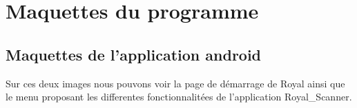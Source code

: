 \section{Maquettes du programme}

\subsection{Maquettes de l'application android}

  \begin{figure}[htbp]
  \begin{center}
    \leavevmode
    \hspace{4cm}
  \end{center}
\end{figure}

Sur ces deux images nous pouvons voir la page de démarrage de Royal ainsi que le menu proposant les differentes fonctionnalitées de l'application Royal\_Scanner.


